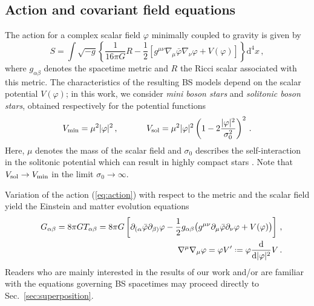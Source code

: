 \documentclass[]{iopart}
\newcommand{\du}{\mathrm{d}}
\newcommand{\us}[1]{\textcolor{teal}{[{\it\textbf{US: #1}}]} }
\renewcommand{\th}[1]{\textcolor{orange}{[{\it\textbf{TH: #1}}]} }
\newcommand*{\defeq}{\mathrel{\vcenter{\baselineskip0.5ex \lineskiplimit0pt
                     \hbox{\scriptsize.}\hbox{\scriptsize.}}}%
                     =}
\begin{document}
\subsection{Action and covariant field equations}
%
The action for a complex scalar field $\varphi$ minimally coupled to gravity is given by
%
\begin{equation}
S = \int\sqrt{-g}\left\{
  \frac{1}{16\pi G}R - \frac{1}{2}\left[ 
  g^{\mu \nu}\nabla_{\mu}\bar{\varphi}\nabla_{\nu}\varphi
  + V(\varphi)\right] \right\} \du^4 x\,,
  \label{eq:action}
\end{equation}
%
where $g_{\alpha\beta}$ denotes the spacetime metric and $R$ the
Ricci scalar associated with this metric. The characteristics
of the resulting BS models depend on the scalar potential
$V(\varphi)$; in this work, we consider {\it mini boson stars}
and {\it solitonic boson stars}, obtained respectively
for the potential functions
%
\begin{equation}
  V_{\rm min} = \mu^2 |\varphi|^2\,,~~~~~~~~~~
  V_{\rm sol} = \mu^2 |\varphi|^2\left(1-2\frac{|\varphi|^2}{\sigma_0^2}
  \right)^2\,.
  \label{eq:pot}
\end{equation}
%
Here, $\mu$ denotes the mass of the scalar field and $\sigma_0$
describes the self-interaction in the solitonic potential
which can result in highly compact stars
\cite{Lee:1986ts}. Note that $V_{\rm sol}\rightarrow 
V_{\rm min}$ in the limit $\sigma_0\rightarrow \infty$.

Variation of the action (\ref{eq:action}) with respect to the
metric and the scalar field yield the Einstein and matter
evolution equations
%
\begin{eqnarray}
  &&G_{\alpha\beta} = 8\pi G T_{\alpha\beta}
  = 8\pi G\left[
  \partial_{(\alpha}\bar{\varphi}\partial_{\beta)}\varphi
  -\frac{1}{2}g_{\alpha\beta}
  \big(
  g^{\mu\nu}\partial_{\mu}
  \bar{\varphi}\partial_{\nu}\varphi+ V(\varphi)
  \big)
  \right]\,, \label{eq:Einstein} \\
  &&\nabla^{\mu}\nabla_{\mu}\varphi = \varphi V'
  \defeq \varphi \frac{\du}{\du |\varphi|^2}
  V\,.
  \label{eq:Boxvarphi}
\end{eqnarray}
%
Readers who are mainly interested in the results of our work
and/or are familiar with the equations governing BS spacetimes
may proceed directly to Sec.~\ref{sec:superposition}.

\end{document}

